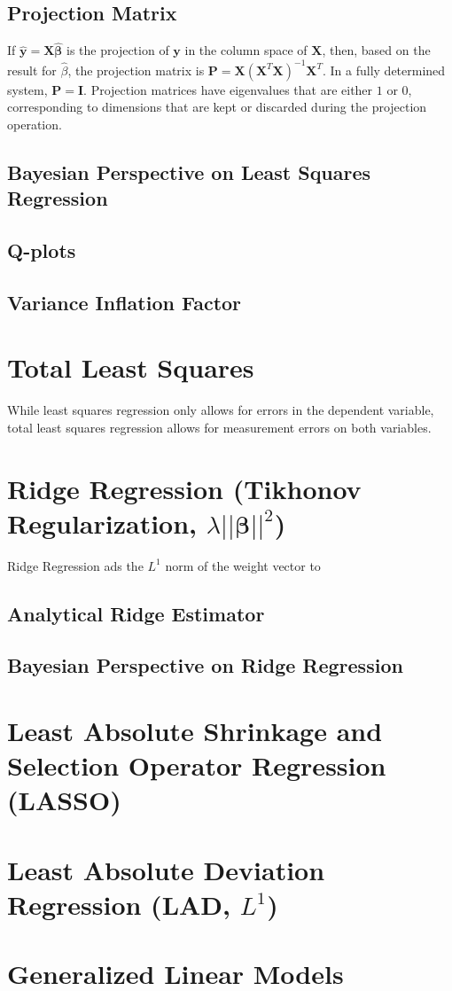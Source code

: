 \subsection{Projection Matrix}

If $\mathbf{\hat{y}}=\mathbf{X}\mathbf{\hat{\beta}}$ is the projection of $\mathbf{y}$ in the column space of $\mathbf{X}$, then, based on the result for $\hat{\beta}$, the projection matrix is $\mathbf{P} = \mathbf{X}\left(\mathbf{X}^T\mathbf{X}\right)^{-1}\mathbf{X}^T$. In a fully determined system, $\mathbf{P}=\mathbf{I}$. Projection matrices have eigenvalues that are either $1$ or $0$, corresponding to dimensions that are kept or discarded during the projection operation.


\subsection{Bayesian Perspective on Least Squares Regression}




\subsection{Q-plots}
\subsection{Variance Inflation Factor}

\section{Total Least Squares}
While least squares regression only allows for errors in the dependent variable, total least squares regression allows for measurement errors on both variables.

\section{Ridge Regression (Tikhonov Regularization, $\lambda ||\mathbf{\beta}||^2$)}
Ridge Regression ads the $L^1$ norm of the weight vector to 

\subsection{Analytical Ridge Estimator}
\subsection{Bayesian Perspective on Ridge Regression}

\section{Least Absolute Shrinkage and Selection Operator Regression (LASSO)}


\section{Least Absolute Deviation Regression (LAD, $L^1$)}


\section{Generalized Linear Models}






\chapauthor{}


